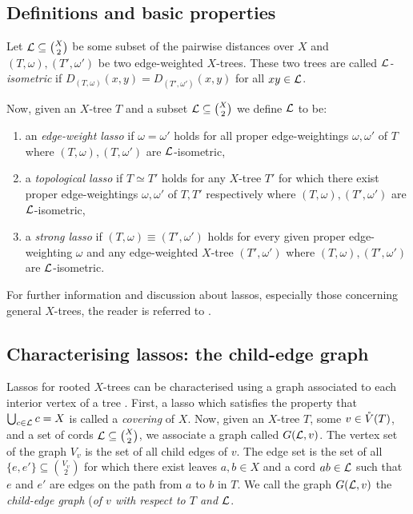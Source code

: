 \subsection{Definitions and basic properties}
\label{sec:defin-basic-prop}

Let ${\mathcal L} \subseteq {X \choose 2}$ be some subset of the pairwise distances
over $X$ and $(T,\omega), (T',\omega')$ be two edge-weighted $X$-trees.  These
two trees are called \textit{${\mathcal L}$-isometric} if $D_{(T,\omega)}(x,y) =
D_{(T',\omega')}(x,y)$ for all $xy \in {\mathcal L}$.

Now, given an $X$-tree $T$ and a subset ${\mathcal L} \subseteq {X \choose 2}$ we
define ${\mathcal L}$ to be:
\begin{enumerate}[label=(\roman*)]
\item an \textit{edge-weight lasso} if $\omega = \omega'$ holds for all proper
  edge-weightings $\omega,\omega'$ of $T$ where $(T,\omega),(T,\omega')$ are
  ${\mathcal L}$-isometric,
\item a \textit{topological lasso} if $T \simeq T'$ holds for any $X$-tree
  $T'$ for which there exist proper edge-weightings $\omega,\omega'$ of $T,T'$
  respectively where $(T,\omega),(T',\omega')$ are ${\mathcal L}$-isometric,
\item a \textit{strong lasso} if $(T,\omega) \equiv (T',\omega')$ holds for
  every given proper edge-weighting $\omega$ and any edge-weighted $X$-tree
  $(T',\omega')$ where $(T,\omega),(T',\omega')$ are ${\mathcal L}$-isometric.
\end{enumerate}

For further information and discussion about lassos, especially those
concerning general $X$-trees, the reader is referred to \citep{DHS11}.

\subsection{Characterising lassos: the child-edge graph}
\label{sec:lassoing-rooted-x}

Lassos for rooted $X$-trees can be characterised using a graph associated to
each interior vertex of a tree \citep{HP13}.  First, a lasso which satisfies
the property that $\bigcup_{c \in {\mathcal L}} c = X$ is called a \textit{covering} of
$X$.  Now, given an $X$-tree $T$, some $v \in \mathring{V}(T)$, and a set of cords ${\mathcal L}
\subseteq {X \choose 2}$, we associate a graph called $G({\mathcal L},v)$.  The vertex
set of the graph $V_v$ is the set of all child edges of $v$.  The edge set is
the set of all $\{e,e'\} \subseteq {V_v \choose 2}$ for which there exist
leaves $a,b \in X$ and a cord $ab \in {\mathcal L}$ such that $e$ and $e'$ are edges on
the path from $a$ to $b$ in $T$.  We call the graph $G({\mathcal L},v)$ the
\textit{child-edge graph} (\textit{of $v$ with respect to $T$ and ${\mathcal L}$}.

